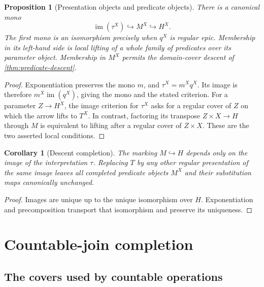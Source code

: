 \documentclass[11pt,a4paper]{article}
\numberwithin{equation}{section}
\newtheorem{proposition}[proposition]{Proposition}
\newtheorem{corollary}[corollary]{Corollary}
\theoremstyle{definition}
\theoremstyle{remark}
\theoremstyle{plain}
\newcommand{\im}{\operatorname{im}}
\newcommand{\incl}{\hookrightarrow}
\begin{document}
\begin{proposition}[Presentation objects and predicate objects]
\label{prop:presentation-comparison}
There is a canonical mono
\begin{equation}\label{eq:presentation-comparison}
 \im(\tau^X)\incl M^X\incl H^X.
\end{equation}
The first mono is an isomorphism precisely when $q^X$ is regular epic.
Membership in its left-hand side is local lifting of a whole family of
predicates over its parameter object. Membership in $M^X$ permits the
domain-cover descent of \cref{thm:predicate-descent}.
\end{proposition}
\begin{proof}
Exponentiation preserves the mono $m$, and $\tau^X=m^Xq^X$.
Its image is therefore $m^X\im(q^X)$, giving the mono and the stated
criterion. For a parameter $Z\to H^X$, the image criterion for
$\tau^X$ asks for a regular cover of $Z$ on which the arrow lifts to
$T^X$. In contrast, factoring its transpose $Z\times X\to H$ through
$M$ is equivalent to lifting after a regular cover of $Z\times X$.
These are the two asserted local conditions.
\end{proof}

\begin{corollary}[Descent completion]
\label{cor:descent-completion}
The marking $M\incl H$ depends only on the image of the interpretation
$\tau$. Replacing $T$ by any other regular presentation of the same
image leaves all completed predicate objects $M^X$ and their substitution
maps canonically unchanged.
\end{corollary}
\begin{proof}
Images are unique up to the unique isomorphism over $H$. Exponentiation
and precomposition transport that isomorphism and preserve its uniqueness.
\end{proof}

\section{Countable-join completion}
\label{sec:completion}

\subsection{The covers used by countable operations}
\end{document}
